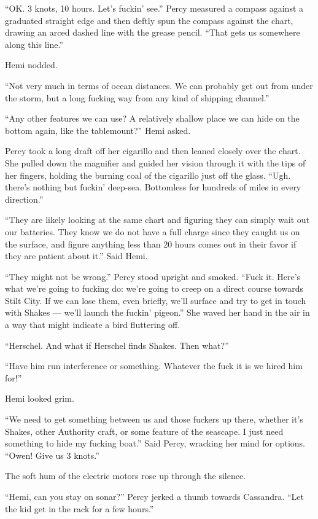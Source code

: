 \documentclass[
]{scrbook}
\begin{document}
``OK. 3 knots, 10 hours. Let's fuckin' see.'' Percy measured a compass
against a graduated straight edge and then deftly spun the compass
against the chart, drawing an arced dashed line with the grease pencil.
``That gets us somewhere along this line.''

Hemi nodded.

``Not very much in terms of ocean distances. We can probably get out
from under the storm, but a long fucking way from any kind of shipping
channel.''

``Any other features we can use? A relatively shallow place we can hide
on the bottom again, like the tablemount?'' Hemi asked.

Percy took a long draft off her cigarillo and then leaned closely over
the chart. She pulled down the magnifier and guided her vision through
it with the tips of her fingers, holding the burning coal of the
cigarillo just off the glass. ``Ugh. there's nothing but fuckin'
deep-sea. Bottomless for hundreds of miles in every direction.''

``They are likely looking at the same chart and figuring they can simply
wait out our batteries. They know we do not have a full charge since
they caught us on the surface, and figure anything less than 20 hours
comes out in their favor if they are patient about it.'' Said Hemi.

``They might not be wrong.'' Percy stood upright and smoked. ``Fuck it.
Here's what we're going to fucking do: we're going to creep on a direct
course towards Stilt City. If we can lose them, even briefly, we'll
surface and try to get in touch with Shakes --- we'll launch the fuckin'
pigeon.'' She waved her hand in the air in a way that might indicate a
bird fluttering off.

``Herschel. And what if Herschel finds Shakes. Then what?''

``Have him run interference or something. Whatever the fuck it is we
hired him for!''

Hemi looked grim.

``We need to get something between us and those fuckers up there,
whether it's Shakes, other Authority craft, or some feature of the
seascape. I just need something to hide my fucking boat.'' Said Percy,
wracking her mind for options. ``Owen! Give us 3 knots.''

The soft hum of the electric motors rose up through the silence.

``Hemi, can you stay on sonar?'' Percy jerked a thumb towards Cassandra.
``Let the kid get in the rack for a few hours.''
\end{document}
